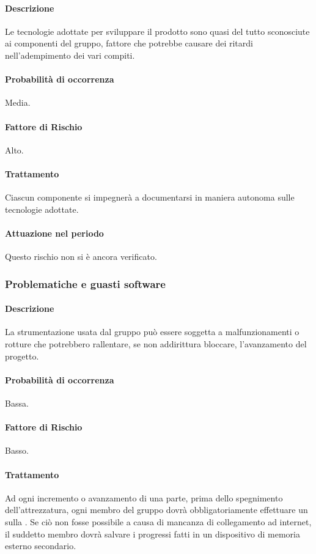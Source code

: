 \paragraph{Descrizione}
Le tecnologie adottate per sviluppare il prodotto sono quasi del tutto sconosciute ai componenti del gruppo, fattore che potrebbe causare dei ritardi nell'adempimento dei vari compiti.
\paragraph{Probabilità di occorrenza}
Media.
\paragraph{Fattore di Rischio}
Alto.
\paragraph{Trattamento}
Ciascun componente si impegnerà a documentarsi in maniera autonoma sulle tecnologie adottate.
\paragraph{Attuazione nel periodo}
Questo rischio non si è ancora verificato.

\subsubsection{Problematiche e guasti software}
\paragraph{Descrizione}
La strumentazione usata dal gruppo può essere soggetta a malfunzionamenti o rotture che potrebbero rallentare, se non addirittura bloccare, l'avanzamento del progetto.
\paragraph{Probabilità di occorrenza}
Bassa.
\paragraph{Fattore di Rischio}
Basso.
\paragraph{Trattamento}
Ad ogni incremento o avanzamento di una parte, prima dello spegnimento dell'attrezzatura, ogni membro del gruppo dovrà obbligatoriamente effettuare un  sulla  . Se ciò non fosse possibile a causa di mancanza di collegamento ad internet, il suddetto membro dovrà salvare i progressi fatti in un dispositivo di memoria esterno secondario. 
